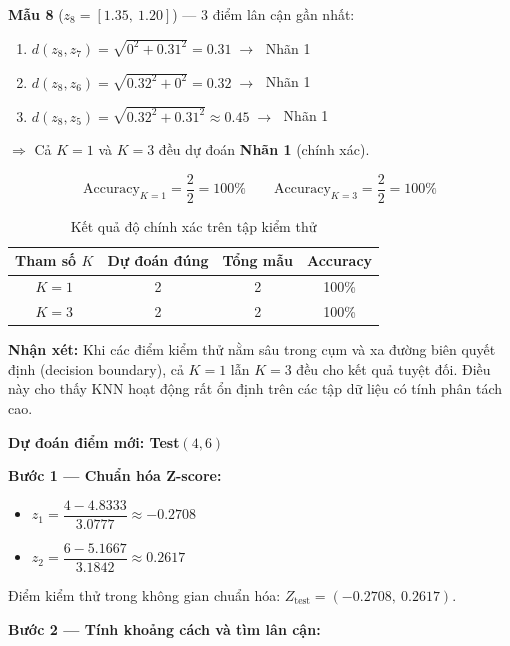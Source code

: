 \documentclass[12pt,a4paper]{article}
\begin{document}
\medskip
\noindent\textbf{Mẫu 8} ($z_8 = [1.35,\ 1.20]$) — 3 điểm lân cận gần nhất:
\begin{enumerate}
    \item $d(z_8, z_7) = \sqrt{0^2 + 0.31^2} = 0.31 \;\to\;$ Nhãn 1
    \item $d(z_8, z_6) = \sqrt{0.32^2 + 0^2} = 0.32 \;\to\;$ Nhãn 1
    \item $d(z_8, z_5) = \sqrt{0.32^2 + 0.31^2} \approx 0.45 \;\to\;$ Nhãn 1
\end{enumerate}
$\Rightarrow$ Cả $K = 1$ và $K = 3$ đều dự đoán \textbf{Nhãn 1} (chính xác).

\begin{equation}
    \text{Accuracy}_{K=1} = \frac{2}{2} = 100\%
    \qquad
    \text{Accuracy}_{K=3} = \frac{2}{2} = 100\%
\end{equation}

\begin{table}[H]
    \centering
    \caption{Kết quả độ chính xác trên tập kiểm thử}
    \vspace{0.2cm}
    \renewcommand{\arraystretch}{1.4}
    \begin{tabular}{cccc}
        \toprule
        \textbf{Tham số $K$} & \textbf{Dự đoán đúng} & \textbf{Tổng mẫu} & \textbf{Accuracy} \\
        \midrule
        $K = 1$ & 2 & 2 & 100\% \\
        $K = 3$ & 2 & 2 & 100\% \\
        \bottomrule
    \end{tabular}
\end{table}

\noindent\textbf{Nhận xét:} Khi các điểm kiểm thử nằm sâu trong cụm và xa đường biên quyết định (decision boundary), cả $K = 1$ lẫn $K = 3$ đều cho kết quả tuyệt đối. Điều này cho thấy KNN hoạt động rất ổn định trên các tập dữ liệu có tính phân tách cao.

\textbf{Dự đoán điểm mới: Test$(4, 6)$}

\noindent\textbf{Bước 1 — Chuẩn hóa Z-score:}
\begin{itemize}
    \item $z_1 = \dfrac{4 - 4.8333}{3.0777} \approx -0.2708$
    \item $z_2 = \dfrac{6 - 5.1667}{3.1842} \approx 0.2617$
\end{itemize}
Điểm kiểm thử trong không gian chuẩn hóa: $Z_{\text{test}} = (-0.2708,\ 0.2617)$.

\medskip
\noindent\textbf{Bước 2 — Tính khoảng cách và tìm lân cận:}
\end{document}

